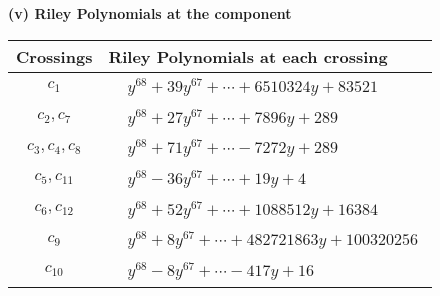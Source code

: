 \documentclass[1p]{elsarticle_modified}
\theoremstyle{definition}
\begin{document}
\newpage\renewcommand{\arraystretch}{1}
\flushleft \textbf{(v) Riley Polynomials at the component}\newline \\
\begin{tabular}{m{50pt}|m{274pt}}
Crossings & \hspace{64pt}Riley Polynomials at each crossing \\
\hline $$\begin{aligned}c_{1}\end{aligned}$$&$\begin{aligned}
&y^{68}+39 y^{67}+\cdots+6510324 y+83521
\end{aligned}$\\
\hline $$\begin{aligned}c_{2},c_{7}\end{aligned}$$&$\begin{aligned}
&y^{68}+27 y^{67}+\cdots+7896 y+289
\end{aligned}$\\
\hline $$\begin{aligned}c_{3},c_{4},c_{8}\end{aligned}$$&$\begin{aligned}
&y^{68}+71 y^{67}+\cdots-7272 y+289
\end{aligned}$\\
\hline $$\begin{aligned}c_{5},c_{11}\end{aligned}$$&$\begin{aligned}
&y^{68}-36 y^{67}+\cdots+19 y+4
\end{aligned}$\\
\hline $$\begin{aligned}c_{6},c_{12}\end{aligned}$$&$\begin{aligned}
&y^{68}+52 y^{67}+\cdots+1088512 y+16384
\end{aligned}$\\
\hline $$\begin{aligned}c_{9}\end{aligned}$$&$\begin{aligned}
&y^{68}+8 y^{67}+\cdots+482721863 y+100320256
\end{aligned}$\\
\hline $$\begin{aligned}c_{10}\end{aligned}$$&$\begin{aligned}
&y^{68}-8 y^{67}+\cdots-417 y+16
\end{aligned}$\\
\hline
\end{tabular}\\~\\
\end{document}
